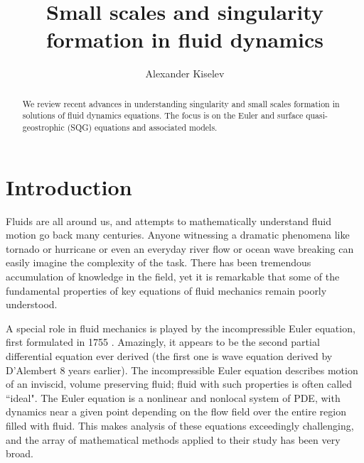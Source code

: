 \documentclass[reqno,centertags, 11pt]{amsart}
\title[Singularity formation in fluids]{Small scales and singularity formation in fluid dynamics}
\author{Alexander Kiselev}
\begin{document}

\begin{abstract}
We review recent advances in understanding singularity and small scales formation in solutions of fluid dynamics equations.
The focus is on the Euler and surface quasi-geostrophic (SQG) equations and associated models.
\end{abstract}

%

\maketitle

\section{Introduction}\label{intro}

Fluids are all around us, and attempts to mathematically understand fluid motion go back many centuries. Anyone witnessing a dramatic phenomena like
tornado or hurricane or even an everyday river flow or ocean wave breaking can easily imagine the complexity of the task. There has been
tremendous accumulation of knowledge in the field, yet it is remarkable that some of the fundamental properties of key equations of fluid mechanics
remain poorly understood.

A special role in fluid mechanics is played by the incompressible Euler equation, first formulated in 1755 \cite{Euler}. Amazingly,
it appears to be the second partial differential equation ever derived (the first one is wave equation derived by D'Alembert 8 years earlier).
The incompressible Euler equation describes motion of an inviscid, volume preserving fluid; fluid with such properties is often called ``ideal".
The Euler equation is a nonlinear and nonlocal system of PDE, with dynamics near a given point depending on the flow field over the entire region filled with fluid.
This makes analysis of these equations exceedingly challenging, and the array of mathematical methods applied to their study has been very broad.
\end{document}
